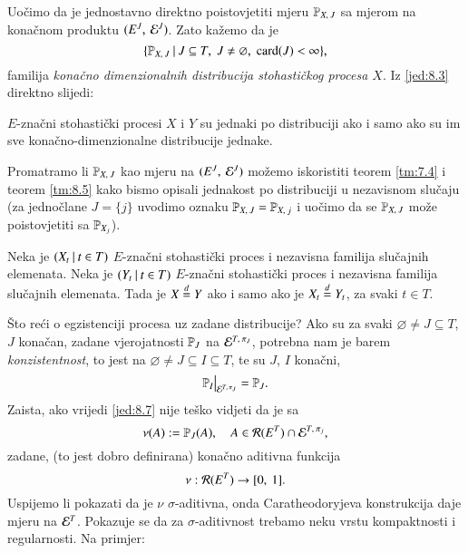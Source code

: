 Uo\v cimo da je jednostavno direktno poistovjetiti mjeru $\mathbb{P}_{X, \: J}$ sa mjerom na kona\v cnom produktu $({E^J}, \: {\mathcal{E}^J})$.
Zato ka\v zemo da je
\begin{equation}    \label{jed:8.4}
    \{{\mathbb{P}_{X, \: J}} \: | \: {J \subseteq T, \; J \neq \varnothing, \; \textnormal{card}({J}) < \infty}\},
\end{equation}
familija \emph{kona\v cno dimenzionalnih distribucija stohasti\v ckog procesa $X$}.
Iz \eqref{jed:8.3} direktno slijedi:

\begin{tm}  \label{tm:8.5}
    $E$-zna\v cni stohasti\v cki procesi $X$ i $Y$ su jednaki po distribuciji ako i samo ako su im sve kona\v cno-dimenzionalne distribucije jednake.
\end{tm}

Promatramo li $\mathbb{P}_{X, \: J}$ kao mjeru na $({E^J}, \: {\mathcal{E}^J})$ mo\v zemo iskoristiti teorem \ref{tm:7.4} i teorem \ref{tm:8.5} kako bismo opisali jednakost po distribuciji u nezavisnom slu\v caju (za jedno\v clane $J = \{j\}$ uvodimo oznaku $\mathbb{P}_{X, \: J} = \mathbb{P}_{X, \: j}$ i uo\v cimo da se $\mathbb{P}_{X, \: J}$ mo\v ze poistovjetiti sa $\mathbb{P}_{X_j}$).

\begin{kor} \label{kor:8.6}
    Neka je $({X_t} \: | \: {t \in T})$ $E$-zna\v cni stohasti\v cki proces i nezavisna familija slu\v cajnih elemenata.
    Neka je $({Y_t} \: | \: {t \in T})$ $E$-zna\v cni stohasti\v cki proces i nezavisna familija slu\v cajnih elemenata.
    Tada je $X \overset{d}{=} Y$ ako i samo ako je $X_t \overset{d}{=} Y_t$, za svaki $t \in T$.
\end{kor}

\v Sto re\' ci o egzistenciji procesa uz zadane distribucije?
Ako su za svaki $\varnothing \neq J \subseteq T$, $J$ kona\v can, zadane vjerojatnosti $\mathbb{P}_J$ na $\mathcal{E}^{T, \: \pi_J}$, potrebna nam je barem \emph{konzistentnost}, to jest na $\varnothing \neq J \subseteq  I \subseteq T$, te su $J$, $I$ kona\v cni,
\begin{equation}    \label{jed:8.7}
    \restr{\masP_I}{\famE^{T, \: \pi_J}} = \masP_J.
\end{equation}
Zaista, ako vrijedi \eqref{jed:8.7} nije te\v sko vidjeti da je sa
\begin{equation*}
    \nu (A) := \mathbb{P}_J (A), \quad A \in \mathcal{R}({E^T}) \cap \mathcal{E}^{T, \: \pi_j},
\end{equation*}
zadane, (to jest dobro definirana) kona\v cno aditivna funkcija
\begin{equation*}
    \nu : \mathcal{R}({E^T}) \to [{0}, \:{1}].
\end{equation*}
Uspijemo li pokazati da je $\nu$ $\sigma$-aditivna, onda Caratheodoryjeva konstrukcija daje mjeru na $\mathcal{E}^T$.
Pokazuje se da za $\sigma$-aditivnost trebamo neku vrstu kompaktnosti i regularnosti.
Na primjer:

